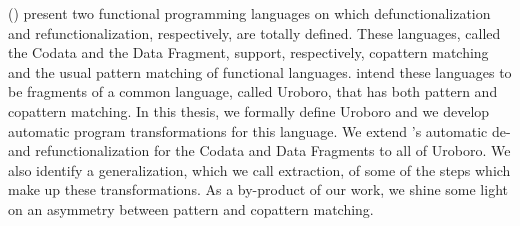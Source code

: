 % 
% 
%
\citeauthor{rendel15automatic} (\citeyear{rendel15automatic}) present two functional programming languages on which defunctionalization and refunctionalization, respectively, are totally defined. These languages, called the Codata and the Data Fragment, support, respectively, copattern matching and the usual pattern matching of functional languages. \citeauthor{rendel15automatic} intend these languages to be fragments of a common language, called Uroboro, that has both pattern and copattern matching. In this thesis, we formally define Uroboro and we develop automatic program transformations for this language. We extend \citeauthor{rendel15automatic}'s automatic de- and refunctionalization for the Codata and Data Fragments to all of Uroboro. We also identify a generalization, which we call extraction, of some of the steps which make up these transformations. As a by-product of our work, we shine some light on an asymmetry between pattern and copattern matching.
